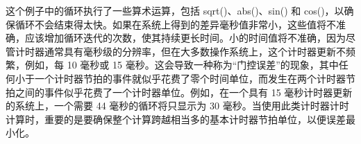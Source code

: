 这个例子中的循环执行了一些算术运算，包括 sqrt()、abs()、sin() 和 cos()，以确保循环不会结束得太快。如果在系统上得到的差异毫秒值非常小，这些值将不准确，应该增加循环迭代的次数，使其持续更长时间。小的时间值将不准确，因为尽管计时器通常具有毫秒级的分辨率，但在大多数操作系统上，这个计时器更新不频繁，例如，每 10 毫秒或 15 毫秒。这会导致一种称为“门控误差”的现象，其中任何小于一个计时器节拍的事件就似乎花费了零个时间单位，而发生在两个计时器节拍之间的事件似乎花费了一个计时器单位。例如，在一个具有 15 毫秒计时器更新的系统上，一个需要 44 毫秒的循环将只显示为 30 毫秒。当使用此类计时器计时计算时，重要的是要确保整个计算跨越相当多的基本计时器节拍单位，以便误差最小化。
































